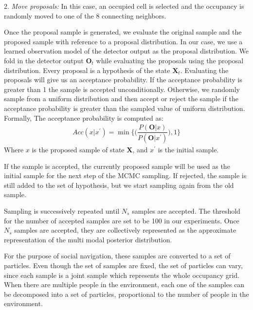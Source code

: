 2. \textit{Move proposals:}
In this case, an occupied cell is selected and the occupancy is randomly moved to one of the 8 connecting neighbors.

Once the proposal sample is generated, we evaluate the original sample and the proposed sample with reference to a proposal distribution. In our case, we use a learned observation model of the detector output as the proposal distribution. We fold in the detector output $\textbf{O}_{t}$ while evaluating the proposals using the proposal distribution. Every proposal is a hypothesis of the state $\textbf{X}_{t}$.
Evaluating the proposals will give us an acceptance probability. If the acceptance probability is greater than 1 the sample is accepted unconditionally. 
Otherwise, we randomly sample from a uniform distribution and then accept or reject the sample if the acceptance probability is greater than the sampled value of uniform distribution. Formally,
The acceptance probability is computed as:
\begin{align}
Acc(x|x^{'}) = \min\Big\lbrace\Big(\dfrac{P(\textbf{O}|x)}{P(\textbf{O}|x^{'})}\Big),1\Big\rbrace
\end{align}
Where $x$ is the proposed sample of state \textbf{X}, and $x^{'}$ is the initial sample.

If the sample is accepted, the currently proposed sample will be used as the initial sample for the next step of the MCMC sampling. If rejected, the sample is still added to the set of hypothesis, but we start sampling again from the old sample.


Sampling is successively repeated until $N_{s}$ samples are accepted. The threshold for the number of accepted samples are set to be 100 in our experiments. Once $N_{s}$ samples are accepted, they are collectively represented as the approximate representation of the multi modal posterior distribution. 

For the purpose of social navigation, these samples are converted to a set of particles. Even though the set of samples are fixed, the set of particles can vary, since each sample is a joint sample which represents the whole occupancy grid. When there are multiple people in the environment, each one of the samples can be decomposed into a set of particles, proportional to the number of people in the environment. %